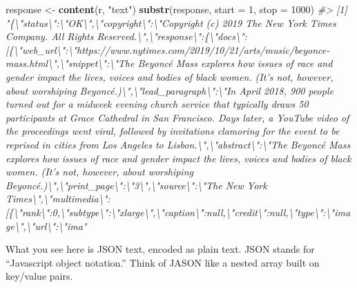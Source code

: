 \documentclass[]{book}
\newenvironment{Shaded}{\begin{snugshade}}{\end{snugshade}}
\newcommand{\KeywordTok}[1]{\textcolor[rgb]{0.13,0.29,0.53}{\textbf{#1}}}
\newcommand{\DataTypeTok}[1]{\textcolor[rgb]{0.13,0.29,0.53}{#1}}
\newcommand{\DecValTok}[1]{\textcolor[rgb]{0.00,0.00,0.81}{#1}}
\newcommand{\StringTok}[1]{\textcolor[rgb]{0.31,0.60,0.02}{#1}}
\newcommand{\CommentTok}[1]{\textcolor[rgb]{0.56,0.35,0.01}{\textit{#1}}}
\newcommand{\NormalTok}[1]{#1}
\begin{document}
\begin{Shaded}
\begin{Highlighting}[]
\NormalTok{response <-}\StringTok{ }\KeywordTok{content}\NormalTok{(r, }\StringTok{"text"}\NormalTok{)}
\KeywordTok{substr}\NormalTok{(response, }\DataTypeTok{start =} \DecValTok{1}\NormalTok{, }\DataTypeTok{stop =} \DecValTok{1000}\NormalTok{)}
\CommentTok{#> [1] "\{\textbackslash{}"status\textbackslash{}":\textbackslash{}"OK\textbackslash{}",\textbackslash{}"copyright\textbackslash{}":\textbackslash{}"Copyright (c) 2019 The New York Times Company. All Rights Reserved.\textbackslash{}",\textbackslash{}"response\textbackslash{}":\{\textbackslash{}"docs\textbackslash{}":[\{\textbackslash{}"web_url\textbackslash{}":\textbackslash{}"https://www.nytimes.com/2019/10/21/arts/music/beyonce-mass.html\textbackslash{}",\textbackslash{}"snippet\textbackslash{}":\textbackslash{}"The Beyoncé Mass explores how issues of race and gender impact the lives, voices and bodies of black women. (It’s not, however, about worshiping Beyoncé.)\textbackslash{}",\textbackslash{}"lead_paragraph\textbackslash{}":\textbackslash{}"In April 2018, 900 people turned out for a midweek evening church service that typically draws 50 participants at Grace Cathedral in San Francisco. Days later, a YouTube video of the proceedings went viral, followed by invitations clamoring for the event to be reprised in cities from Los Angeles to Lisbon.\textbackslash{}",\textbackslash{}"abstract\textbackslash{}":\textbackslash{}"The Beyoncé Mass explores how issues of race and gender impact the lives, voices and bodies of black women. (It’s not, however, about worshiping Beyoncé.)\textbackslash{}",\textbackslash{}"print_page\textbackslash{}":\textbackslash{}"3\textbackslash{}",\textbackslash{}"source\textbackslash{}":\textbackslash{}"The New York Times\textbackslash{}",\textbackslash{}"multimedia\textbackslash{}":[\{\textbackslash{}"rank\textbackslash{}":0,\textbackslash{}"subtype\textbackslash{}":\textbackslash{}"xlarge\textbackslash{}",\textbackslash{}"caption\textbackslash{}":null,\textbackslash{}"credit\textbackslash{}":null,\textbackslash{}"type\textbackslash{}":\textbackslash{}"image\textbackslash{}",\textbackslash{}"url\textbackslash{}":\textbackslash{}"ima"}
\end{Highlighting}
\end{Shaded}

What you see here is JSON text, encoded as plain text. JSON stands for
``Javascript object notation.'' Think of JASON like a nested array built
on key/value pairs.
\end{document}
